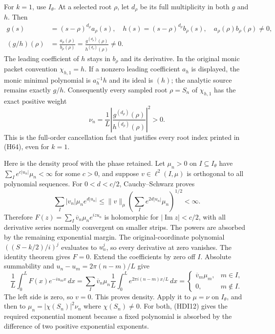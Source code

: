 \documentclass{article}
\begin{document}
For \(k=1\), use \(I_\theta\). At a selected root \(\rho\), let
\(d_\rho\) be its full multiplicity in both \(g\) and \(h\). Then
\[
 \begin{split}
 g(s)&=(s-\rho)^{d_\rho}a_\rho(s),\quad
 h(s)=(s-\rho)^{d_\rho}b_\rho(s),\quad
 a_\rho(\rho)b_\rho(\rho)\ne0,\\
 (g/h)(\rho)&=\frac{a_\rho(\rho)}{b_\rho(\rho)}
 =\frac{g^{(d_\rho)}(\rho)}{h^{(d_\rho)}(\rho)}\ne0.
 \end{split}
 \tag{HDI13}
\]
The leading coefficient of \(h\) stays in \(b_\rho\) and its
derivative. In the original monic packet convention
\(\chi_{h,1}=h\). If a nonzero leading coefficient \(a_h\) is
displayed, the monic minimal polynomial is \(a_h^{-1}h\) and its
ideal is \((h)\); the analytic source remains exactly \(g/h\).
Consequently every sampled root \(\rho=S_n\) of \(\chi_{h,1}\)
has the exact positive weight
\[
 \nu_n=\frac1L
 \left|\frac{g^{(d_\rho)}(\rho)}{h^{(d_\rho)}(\rho)}\right|^2>0.
 \tag{HDI14}
\]
This is the full-order cancellation fact that justifies every
root index printed in (H64), even for \(k=1\).

Here is the density proof with the phase retained. Let
\(\mu_n>0\) on \(I\subseteq I_\theta\) have
\(\sum_Ie^{c|u_n|}\mu_n<\infty\) for some \(c>0\), and suppose
\(v\in\ell^2(I,\mu)\) is orthogonal to all polynomial sequences.
For \(0<d<c/2\), Cauchy--Schwarz proves
\[
 \sum_I|v_n|\mu_ne^{d|u_n|}
 \le\|v\|_\mu\left(\sum_Ie^{2d|u_n|}\mu_n\right)^{1/2}<\infty.
 \tag{HDI15}
\]
Therefore \(F(z)=\sum_I\overline v_n\mu_ne^{izu_n}\) is
holomorphic for \(|\operatorname{Im}z|<c/2\), with all
derivative series normally convergent on smaller strips.
The powers are absorbed by the remaining exponential margin.
The original-coordinate polynomial \(((S-k/2)/i)^j\) evaluates
to \(u_n^j\), so every derivative at zero vanishes. The identity
theorem gives \(F=0\). Extend the coefficients by zero off \(I\).
Absolute summability and \(u_n-u_m=2\pi(n-m)/L\) give
\[
 \frac1L\int_0^L F(x)e^{-iu_mx}\,dx
 =\sum_I\overline v_n\mu_n
 \frac1L\int_0^L e^{2\pi i(n-m)x/L}\,dx
 =\begin{cases}\overline v_m\mu_m,&m\in I,\\0,&m\notin I.\end{cases}
 \tag{HDI16}
\]
The left side is zero, so \(v=0\). This proves density.
Apply it to \(\mu=\nu\) on \(I_\theta\), and then to
\(\mu_n=|\chi(S_n)|^2\nu_n\) where \(\chi(S_n)\ne0\).
For both, (HDI12) gives the required exponential moment because
a fixed polynomial is absorbed by the difference of two
positive exponential exponents.
\end{document}
